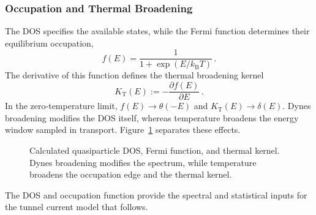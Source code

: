         \subsubsection*{Occupation and Thermal Broadening}
        \label{subsubsec:micro:occupation-broadening}

            The DOS specifies the available states, while the Fermi function determines their equilibrium occupation,
            \begin{equation}
                f(E) = \frac{1}{1+\exp\!\left(E/k_\mathrm{B}T\right)}\,.
                \label{eq:micro:fermi-function}
            \end{equation}
            The derivative of this function defines the thermal broadening kernel
            \begin{equation}
                K_\mathrm{T}(E) := - \frac{\partial f(E)}{\partial E}\,.
                \label{eq:micro:fermi-kernel}
            \end{equation}
            In the zero-temperature limit, $f(E)\to\theta(-E)$ and $K_\mathrm{T}(E)\to\delta(E)$. Dynes broadening modifies the DOS itself, whereas temperature broadens the energy window sampled in transport. Figure~\ref{fig:micro:dos-fermi} separates these effects.

            \begin{figure}
                \centering
                \hfill
                \hfill
                \caption{Calculated quasiparticle DOS, Fermi function, and thermal kernel. Dynes broadening modifies the spectrum, while temperature broadens the occupation edge and the thermal kernel.}
                \label{fig:micro:dos-fermi}
            \end{figure}

            The DOS and occupation function provide the spectral and statistical inputs for the tunnel current model that follows.

